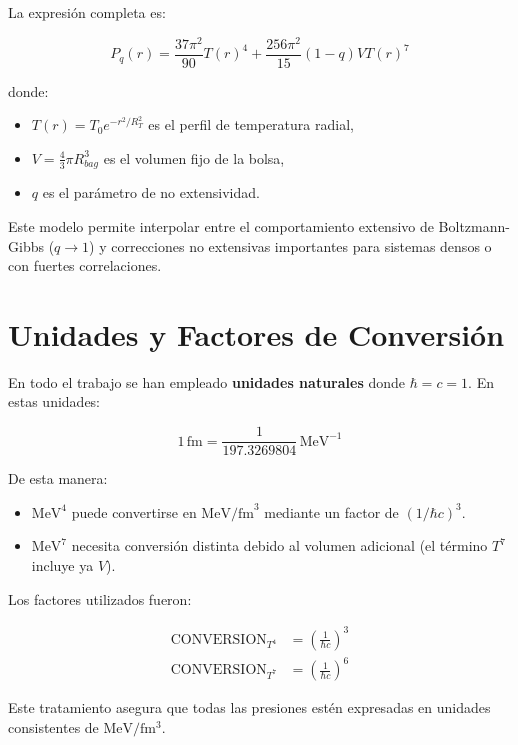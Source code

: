 La expresi\'on completa es:

\begin{equation}
P_q(r) = \frac{37\pi^2}{90} T(r)^4 + \frac{256\pi^2}{15}(1-q) V T(r)^7
\end{equation}

donde:
\begin{itemize}
    \item \( T(r) = T_0 e^{-r^2/R_T^2} \) es el perfil de temperatura radial,
    \item \( V = \frac{4}{3} \pi R_{bag}^3 \) es el volumen fijo de la bolsa,
    \item \( q \) es el par\'ametro de no extensividad.
\end{itemize}

Este modelo permite interpolar entre el comportamiento extensivo de Boltzmann-Gibbs (\( q \to 1 \)) y correcciones no extensivas importantes para sistemas densos o con fuertes correlaciones.

\section{Unidades y Factores de Conversi\'on}

En todo el trabajo se han empleado \textbf{unidades naturales} donde \( \hbar = c = 1 \). En estas unidades:

\begin{equation}
1\,\mathrm{fm} = \frac{1}{197.3269804}\,\mathrm{MeV}^{-1}
\end{equation}

De esta manera:
\begin{itemize}
    \item \( \mathrm{MeV}^4 \) puede convertirse en \( \mathrm{MeV/fm}^3 \) mediante un factor de \( (1/\hbar c)^3 \).
    \item \( \mathrm{MeV}^7 \) necesita conversi\'on distinta debido al volumen adicional (el t\'ermino \( T^7 \) incluye ya \( V \)).
\end{itemize}

Los factores utilizados fueron:

\begin{align}
\mathrm{CONVERSION}_{T^4} &= \left( \frac{1}{\hbar c} \right)^3 \\
\mathrm{CONVERSION}_{T^7} &= \left( \frac{1}{\hbar c} \right)^6
\end{align}

Este tratamiento asegura que todas las presiones estén expresadas en unidades consistentes de \( \mathrm{MeV/fm^3} \).